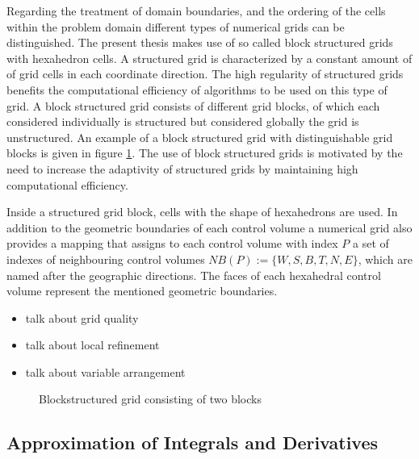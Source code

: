     Regarding the treatment of domain boundaries, and the ordering of the cells within the problem domain different types of numerical grids can be distinguished. The present thesis makes use of so called block structured grids with hexahedron cells. A structured grid is characterized by a constant amount of of grid cells in each coordinate direction. The high regularity of structured grids benefits the computational efficiency of algorithms to be used on this type of grid. A block structured grid consists of different grid blocks, of which each considered individually is structured but considered globally the grid is unstructured. An example of a block structured grid with distinguishable grid blocks is given in figure \ref{fig:blockstruc}. The use of block structured grids is motivated by the need to increase the adaptivity of structured grids by maintaining high computational efficiency. 

    Inside a structured grid block, cells with the shape of hexahedrons are used. In addition to the geometric boundaries of each control volume a numerical grid also provides a mapping that assigns to each control volume with index \(P\) a set of indexes of neighbouring control volumes \(NB(P):=\{W,S,B,T,N,E\}\), which are named after the geographic directions. The faces of each hexahedral control volume represent the mentioned geometric boundaries. 

    \begin{itemize}
      \item talk about grid quality
      \item talk about local refinement
      \item talk about variable arrangement
    \end{itemize}

    \begin{figure}[h]
      \label{fig:blockstruc}
      \qquad
      \caption{Blockstructured grid consisting of two blocks}
     \end{figure}
    
    \subsection{Approximation of Integrals and Derivatives}

